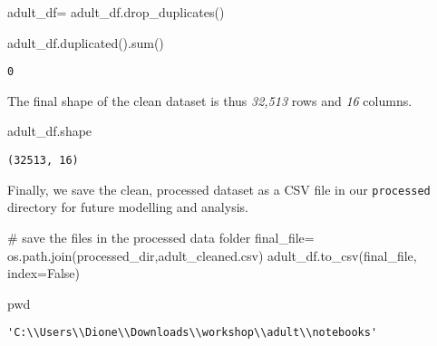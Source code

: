 \documentclass[
  letterpaper,
  DIV=11,
  numbers=noendperiod]{scrartcl}
\newenvironment{Shaded}{\begin{snugshade}}{\end{snugshade}}
\newcommand{\BuiltInTok}[1]{\textcolor[rgb]{0.00,0.23,0.31}{#1}}
\newcommand{\CommentTok}[1]{\textcolor[rgb]{0.37,0.37,0.37}{#1}}
\newcommand{\NormalTok}[1]{\textcolor[rgb]{0.00,0.23,0.31}{#1}}
\newcommand{\OperatorTok}[1]{\textcolor[rgb]{0.37,0.37,0.37}{#1}}
\newcommand{\StringTok}[1]{\textcolor[rgb]{0.13,0.47,0.30}{#1}}
\newcommand{\VariableTok}[1]{\textcolor[rgb]{0.07,0.07,0.07}{#1}}
\begin{document}
\begin{Shaded}
\begin{Highlighting}[]
\NormalTok{adult\_df}\OperatorTok{=}\NormalTok{ adult\_df.drop\_duplicates()}
\end{Highlighting}
\end{Shaded}

\begin{Shaded}
\begin{Highlighting}[]
\NormalTok{adult\_df.duplicated().}\BuiltInTok{sum}\NormalTok{()}
\end{Highlighting}
\end{Shaded}

\begin{verbatim}
0
\end{verbatim}

The final shape of the clean dataset is thus \emph{32,513} rows and
\emph{16} columns.

\begin{Shaded}
\begin{Highlighting}[]
\NormalTok{adult\_df.shape}
\end{Highlighting}
\end{Shaded}

\begin{verbatim}
(32513, 16)
\end{verbatim}

Finally, we save the clean, processed dataset as a CSV file in our
\texttt{processed} directory for future modelling and analysis.

\begin{Shaded}
\begin{Highlighting}[]
\CommentTok{\# save the files in the processed data folder}
\NormalTok{final\_file}\OperatorTok{=}\NormalTok{ os.path.join(processed\_dir,}\StringTok{\textquotesingle{}adult\_cleaned.csv\textquotesingle{}}\NormalTok{)}
\NormalTok{adult\_df.to\_csv(final\_file, index}\OperatorTok{=}\VariableTok{False}\NormalTok{)}
\end{Highlighting}
\end{Shaded}

\begin{Shaded}
\begin{Highlighting}[]
\NormalTok{pwd}
\end{Highlighting}
\end{Shaded}

\begin{verbatim}
'C:\\Users\\Dione\\Downloads\\workshop\\adult\\notebooks'
\end{verbatim}
\end{document}
